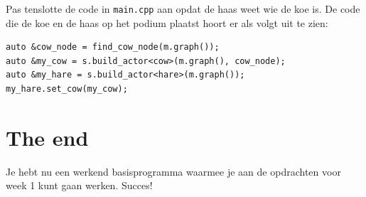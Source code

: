 \documentclass[11pt]{article}
\begin{document}
Pas tenslotte de code in \texttt{main.cpp} aan opdat de haas weet wie de koe is. De
code die de koe en de haas op het podium plaatst hoort er als volgt uit te
zien:
\begin{verbatim}
auto &cow_node = find_cow_node(m.graph());
auto &my_cow = s.build_actor<cow>(m.graph(), cow_node);
auto &my_hare = s.build_actor<hare>(m.graph());
my_hare.set_cow(my_cow);
\end{verbatim}

\section{The end}
\label{sec:org4252455}
Je hebt nu een werkend basisprogramma waarmee je aan de opdrachten voor week
1 kunt gaan werken. Succes!
\end{document}
